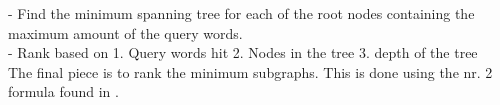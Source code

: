 - Find the minimum spanning tree for each of the root nodes containing the maximum amount of the query words.\\
- Rank based on 1. Query words hit 2. Nodes in the tree 3. depth of the tree\\
The final piece is to rank the minimum subgraphs. This is done using the nr. 2 formula found in \cite{Shi:2016:TRS:2882903.2882941}. 

\clearpage